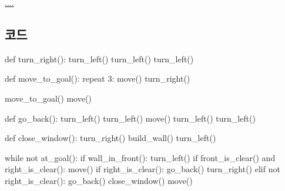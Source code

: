\documentclass[
  b5paperpaper,
  DIV=11,
  numbers=noendperiod]{scrreprt}
\newenvironment{Shaded}{\begin{snugshade}}{\end{snugshade}}
\newcommand{\ControlFlowTok}[1]{\textcolor[rgb]{0.00,0.23,0.31}{#1}}
\newcommand{\DecValTok}[1]{\textcolor[rgb]{0.68,0.00,0.00}{#1}}
\newcommand{\FunctionTok}[1]{\textcolor[rgb]{0.28,0.35,0.67}{#1}}
\newcommand{\NormalTok}[1]{\textcolor[rgb]{0.00,0.23,0.31}{#1}}
\newcommand{\SpecialCharTok}[1]{\textcolor[rgb]{0.37,0.37,0.37}{#1}}
\begin{document}
\url{....}

\hypertarget{uxcf54uxb4dc-22}{%
\subsection{코드}\label{uxcf54uxb4dc-22}}

\begin{Shaded}
\begin{Highlighting}[]
\NormalTok{def }\FunctionTok{turn\_right}\NormalTok{()}\SpecialCharTok{:}
    \FunctionTok{turn\_left}\NormalTok{()}
    \FunctionTok{turn\_left}\NormalTok{()}
    \FunctionTok{turn\_left}\NormalTok{()}
    
\NormalTok{def }\FunctionTok{move\_to\_goal}\NormalTok{()}\SpecialCharTok{:}
    \ControlFlowTok{repeat} \DecValTok{3}\SpecialCharTok{:}
        \FunctionTok{move}\NormalTok{()}
    \FunctionTok{turn\_right}\NormalTok{()}

\FunctionTok{move\_to\_goal}\NormalTok{()}
\FunctionTok{move}\NormalTok{() }

\NormalTok{def }\FunctionTok{go\_back}\NormalTok{()}\SpecialCharTok{:}
    \FunctionTok{turn\_left}\NormalTok{()}
    \FunctionTok{turn\_left}\NormalTok{()}
    \FunctionTok{move}\NormalTok{()}
    \FunctionTok{turn\_left}\NormalTok{()}
    \FunctionTok{turn\_left}\NormalTok{()}
    
\NormalTok{def }\FunctionTok{close\_window}\NormalTok{()}\SpecialCharTok{:}
    \FunctionTok{turn\_right}\NormalTok{()}
    \FunctionTok{build\_wall}\NormalTok{()}
    \FunctionTok{turn\_left}\NormalTok{()}

\ControlFlowTok{while}\NormalTok{ not }\FunctionTok{at\_goal}\NormalTok{()}\SpecialCharTok{:}
    \ControlFlowTok{if} \FunctionTok{wall\_in\_front}\NormalTok{()}\SpecialCharTok{:}
        \FunctionTok{turn\_left}\NormalTok{()}
    \ControlFlowTok{if} \FunctionTok{front\_is\_clear}\NormalTok{() and }\FunctionTok{right\_is\_clear}\NormalTok{()}\SpecialCharTok{:}    
        \FunctionTok{move}\NormalTok{()}
        \ControlFlowTok{if} \FunctionTok{right\_is\_clear}\NormalTok{()}\SpecialCharTok{:}
            \FunctionTok{go\_back}\NormalTok{()}
            \FunctionTok{turn\_right}\NormalTok{()}
\NormalTok{        elif not }\FunctionTok{right\_is\_clear}\NormalTok{()}\SpecialCharTok{:}    
            \FunctionTok{go\_back}\NormalTok{()            }
            \FunctionTok{close\_window}\NormalTok{()}
    \FunctionTok{move}\NormalTok{()}
\end{Highlighting}
\end{Shaded}
\end{document}
